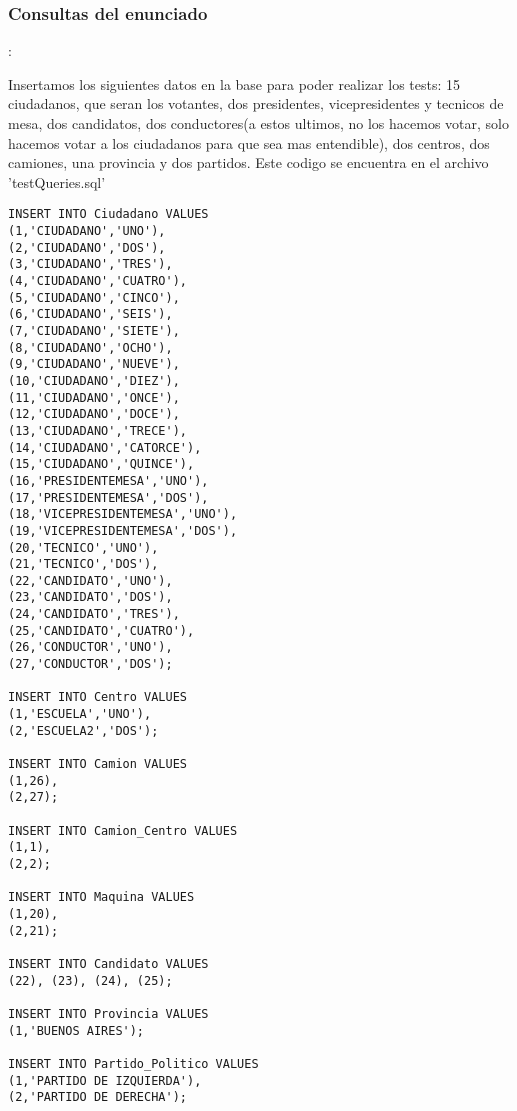 \subsubsection{Consultas del enunciado}:

Insertamos los siguientes datos en la base para poder realizar los tests: 15 ciudadanos, que seran los votantes, dos presidentes, vicepresidentes y tecnicos de mesa, dos candidatos, dos conductores(a estos ultimos, no los hacemos votar, solo hacemos votar a los ciudadanos para que sea mas entendible), dos centros, dos camiones, una provincia y dos partidos. Este codigo se encuentra en el archivo 'testQueries.sql'

\begin{lstlisting}
INSERT INTO Ciudadano VALUES
(1,'CIUDADANO','UNO'),
(2,'CIUDADANO','DOS'),
(3,'CIUDADANO','TRES'),
(4,'CIUDADANO','CUATRO'),
(5,'CIUDADANO','CINCO'),
(6,'CIUDADANO','SEIS'),
(7,'CIUDADANO','SIETE'),
(8,'CIUDADANO','OCHO'),
(9,'CIUDADANO','NUEVE'),
(10,'CIUDADANO','DIEZ'),
(11,'CIUDADANO','ONCE'),
(12,'CIUDADANO','DOCE'),
(13,'CIUDADANO','TRECE'),
(14,'CIUDADANO','CATORCE'),
(15,'CIUDADANO','QUINCE'),
(16,'PRESIDENTEMESA','UNO'),
(17,'PRESIDENTEMESA','DOS'),
(18,'VICEPRESIDENTEMESA','UNO'),
(19,'VICEPRESIDENTEMESA','DOS'),
(20,'TECNICO','UNO'),
(21,'TECNICO','DOS'),
(22,'CANDIDATO','UNO'),
(23,'CANDIDATO','DOS'),
(24,'CANDIDATO','TRES'),
(25,'CANDIDATO','CUATRO'),
(26,'CONDUCTOR','UNO'),
(27,'CONDUCTOR','DOS');

INSERT INTO Centro VALUES
(1,'ESCUELA','UNO'),
(2,'ESCUELA2','DOS');

INSERT INTO Camion VALUES
(1,26),
(2,27);

INSERT INTO Camion_Centro VALUES
(1,1),
(2,2);

INSERT INTO Maquina VALUES
(1,20),
(2,21);

INSERT INTO Candidato VALUES
(22), (23), (24), (25);

INSERT INTO Provincia VALUES
(1,'BUENOS AIRES');

INSERT INTO Partido_Politico VALUES
(1,'PARTIDO DE IZQUIERDA'),
(2,'PARTIDO DE DERECHA');


\end{lstlisting}


